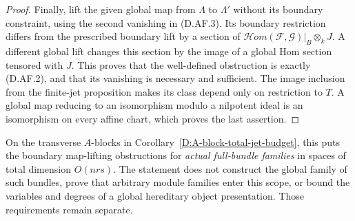 \begin{proof}
Finally, lift the given global map from $\Lambda$ to
$\Lambda'$ without its boundary constraint, using the
second vanishing in (D.AF.3).  Its boundary restriction
differs from the prescribed boundary lift by a section
of $\mathcal Hom(\mathcal F,\mathcal G)|_B\otimes_kJ$.
A different global lift changes this section by the
image of a global Hom section tensored with $J$.
This proves that the well-defined obstruction is exactly
(D.AF.2), and that its vanishing is necessary and sufficient.
The image inclusion from the finite-jet proposition
makes its class depend only on restriction to $T$.
A global map reducing to an isomorphism modulo a
nilpotent ideal is an isomorphism on every affine chart,
which proves the last assertion.
\end{proof}

\begin{remark}
On the transverse $A$-blocks in
Corollary~\ref{D:A-block-total-jet-budget}, this puts the
boundary map-lifting obstructions for \emph{actual full-bundle
families} in spaces of total dimension $O(nrs)$.
The statement does not construct the global family of such
bundles, prove that arbitrary module families enter this
scope, or bound the variables and degrees of a global
hereditary object presentation.  Those requirements remain
separate.
\end{remark}
